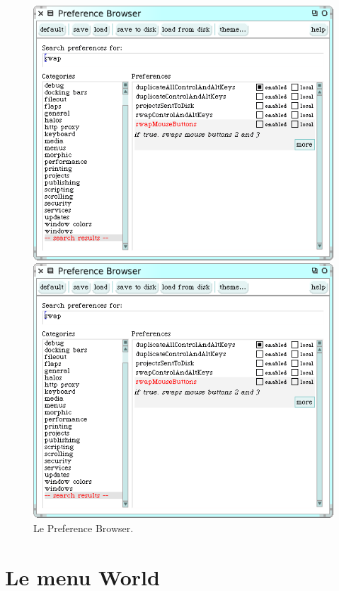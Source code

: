 \documentclass[a4paper,10pt,twoside]{book}
\begin{document}
\begin{figure}[htb]
\ifluluelse
	{\centerline {\includegraphics[width=\textwidth]{PreferenceBrowser}}}
	{\centerline {\includegraphics[scale=0.7]{PreferenceBrowser}}}
\caption{Le Preference Browser.\label{fig:prefBrowser}}
\end{figure}

\section{Le menu World}
\end{document}
